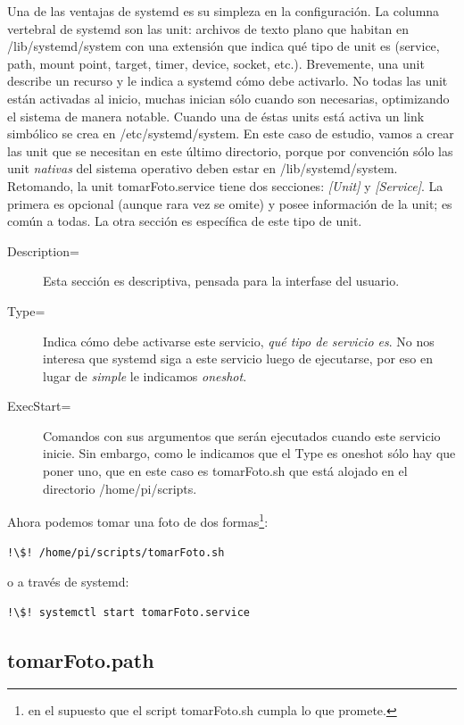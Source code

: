 \documentclass[10pt,a4paper]{article}
\begin{document}
Una de las ventajas de systemd es su simpleza en la configuraci\'on. La columna vertebral de systemd son las unit: archivos de texto plano que habitan en /lib/systemd/system con una extensi\'on que indica qu\'e tipo de unit es (service, path, mount point, target, timer, device, socket, etc.). Brevemente, una unit describe un recurso y le indica a systemd c\'omo debe activarlo. No todas las unit est\'an activadas al inicio, muchas inician s\'olo cuando son necesarias, optimizando el sistema de manera notable. Cuando una de \'estas units est\'a activa un link simb\'olico se crea en /etc/systemd/system. En este caso de estudio, vamos a crear las unit que se necesitan en este \'ultimo directorio, porque por convenci\'on s\'olo las unit \emph{nativas} del sistema operativo deben estar en /lib/systemd/system.\\

Retomando, la unit tomarFoto.service tiene dos secciones: \emph{[Unit]} y \emph{[Service]}. La primera es opcional (aunque rara vez se omite) y posee informaci\'on de la unit; es com\'un a todas. La otra secci\'on es espec\'ifica de este tipo de unit. 

\begin{description}
    \item [Description=] Esta secci\'on es descriptiva, pensada para la interfase del usuario.
    \item [Type=] Indica c\'omo debe activarse este servicio, \emph{qu\'e tipo de servicio es}. No nos interesa que systemd siga a este servicio luego de ejecutarse, por eso en lugar de \emph{simple} le indicamos \emph{oneshot}.
    \item [ExecStart=] Comandos con sus argumentos que ser\'an ejecutados cuando este servicio inicie. Sin embargo, como le indicamos que el Type es oneshot s\'olo hay que poner uno, que en este caso es tomarFoto.sh que est\'a alojado en el directorio /home/pi/scripts.
\end{description}

Ahora podemos tomar una foto de dos formas\footnote{en el supuesto que el script tomarFoto.sh cumpla lo que promete.}:
\begin{lstlisting}
!\$! /home/pi/scripts/tomarFoto.sh
\end{lstlisting}
o a trav\'es de systemd:
\begin{lstlisting}
!\$! systemctl start tomarFoto.service
\end{lstlisting}

\subsection{tomarFoto.path}
\end{document}
